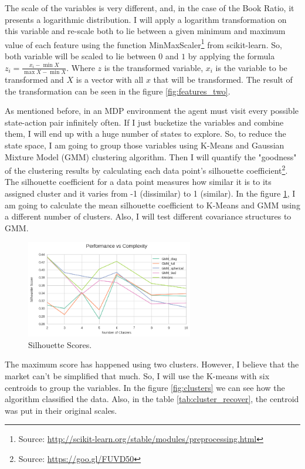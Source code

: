 \documentclass[a4paper]{article}
\begin{document}
The scale of the variables is very different, and, in the case of the Book Ratio, it presents a logarithmic distribution. I will apply a logarithm transformation on this variable and re-scale both to lie between a given minimum and maximum value of each feature using the function MinMaxScaler\footnote{Source: \url{http://scikit-learn.org/stable/modules/preprocessing.html}} from scikit-learn. So, both variable will be scaled to lie between $0$ and $1$ by applying the formula $z_{i} =\frac{x_i - \min{X}}{\max{X} - \min{X}}$. Where $z$ is the transformed variable, $x_i$ is the variable to be transformed and $X$ is a vector with all $x$ that will be transformed. The result of the transformation can be seen in the figure \ref{fig:features_two}.

As mentioned before, in an MDP environment the agent must visit every possible state-action pair infinitely often. If I just bucketize the variables and combine them, I will end up with a huge number of states to explore. So, to reduce the state space, I am going to group those variables using K-Means and Gaussian Mixture Model (GMM) clustering algorithm. Then I will quantify the "goodness" of the clustering results by calculating each data point's silhouette coefficient\footnote{Source: \url{https://goo.gl/FUVD50}}. The silhouette coefficient for a data point measures how similar it is to its assigned cluster and it varies from -1 (dissimilar) to 1 (similar). In the figure \ref{fig:scores}, I am going to calculate the mean silhouette coefficient to K-Means and GMM using a different number of clusters. Also, I will test different covariance structures to GMM.

\begin{figure}[ht]
\centering
\includegraphics[width=0.65\textwidth]{figures/cluster_scores.png}
\caption{\label{fig:scores}Silhouette Scores.}
\end{figure}

The maximum score has happened using two clusters. However, I believe that the market can't be simplified that much. So, I will use the K-means with six centroids to group the variables. In the figure \ref{fig:clusters} we can see how the algorithm classified the data. Also, in the table \ref{tab:cluster_recover}, the centroid was put in their original scales.
\end{document}
